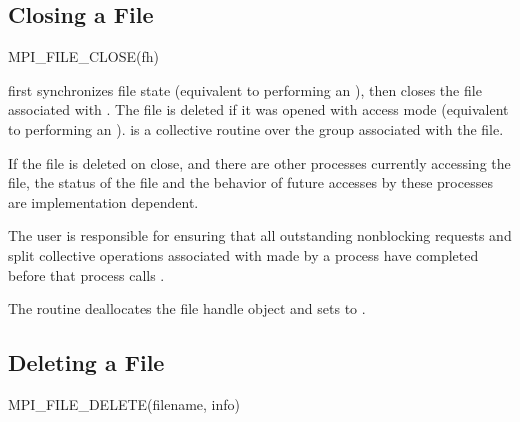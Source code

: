\subsection{Closing a File}
\label{sec:io-filecntl-close}

%
\begin{funcdef}{MPI\_FILE\_CLOSE}{(\mbox{fh})}
\end{funcdef}

 first synchronizes file state
(equivalent to performing an ),
then closes the file associated with .
The file is deleted if it was opened with access mode
(equivalent to performing an ).
 is a collective routine over the group associated with the file.

\begin{users}
If the file is deleted on close, and there are
other processes currently accessing the file,
the status of the file and the behavior of future accesses
by these processes are implementation dependent.
\end{users}

The user is responsible for ensuring that all outstanding
nonblocking requests and split collective
operations associated with 
made by a process have completed
before that process calls .

The  routine deallocates the file handle object
and sets  to .

\subsection{Deleting a File}
\label{sec:io-filecntl-delete}

%
\begin{funcdef}{MPI\_FILE\_DELETE}{(\mbox{filename}, \mbox{info})}
\end{funcdef}

